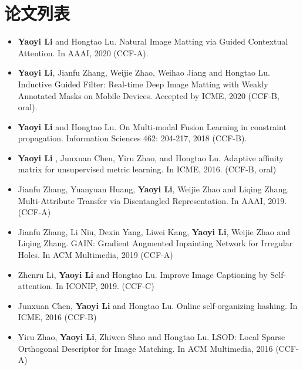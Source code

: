 \documentclass[11pt,a4paper,sans]{moderncv}        %
\begin{document}
\section{论文列表}
\vspace{6pt}
\begin{itemize}


\item{ \textbf{Yaoyi Li} and Hongtao Lu. Natural Image Matting via Guided Contextual Attention. In AAAI, 2020  (CCF-A).
}
\vspace{6pt}
\item{ \textbf{Yaoyi Li}, Jianfu Zhang, Weijie Zhao, Weihao Jiang and Hongtao Lu. Inductive Guided Filter: Real-time Deep Image Matting with Weakly Annotated Masks on Mobile Devices. Accepted by ICME, 2020  (CCF-B, oral).
}
\vspace{6pt}
\item{ \textbf{Yaoyi Li} and Hongtao Lu. On Multi-modal Fusion Learning in constraint propagation. Information Sciences 462: 204-217, 2018 (CCF-B).
}
\vspace{6pt}
\item{ \textbf{Yaoyi Li} , Junxuan Chen, Yiru Zhao, and Hongtao Lu. Adaptive affinity matrix for unsupervised metric learning. In ICME, 2016. (CCF-B, oral)}
\vspace{6pt}
\item{ 	Jianfu Zhang, Yuanyuan Huang, \textbf{Yaoyi Li}, Weijie Zhao and Liqing Zhang.
Multi-Attribute Transfer via Disentangled Representation. In AAAI, 2019. (CCF-A)}
\vspace{6pt}
\item{ Jianfu Zhang, Li Niu, Dexin Yang, Liwei Kang, \textbf{Yaoyi Li}, Weijie Zhao and Liqing Zhang.
GAIN: Gradient Augmented Inpainting Network for Irregular Holes. In ACM Multimedia, 2019 (CCF-A)}
\vspace{6pt}
\item{Zhenru Li, \textbf{Yaoyi Li} and Hongtao Lu.
Improve Image Captioning by Self-attention. In ICONIP, 2019. (CCF-C)}
\vspace{6pt}
\item{ 	Junxuan Chen, \textbf{Yaoyi Li} and Hongtao Lu.
Online self-organizing hashing. In ICME, 2016 (CCF-B)}
\vspace{6pt}
\item{Yiru Zhao, \textbf{Yaoyi Li}, Zhiwen Shao and Hongtao Lu.
LSOD: Local Sparse Orthogonal Descriptor for Image Matching. In ACM Multimedia, 2016 (CCF-A)}

\end{itemize}
\end{document}
